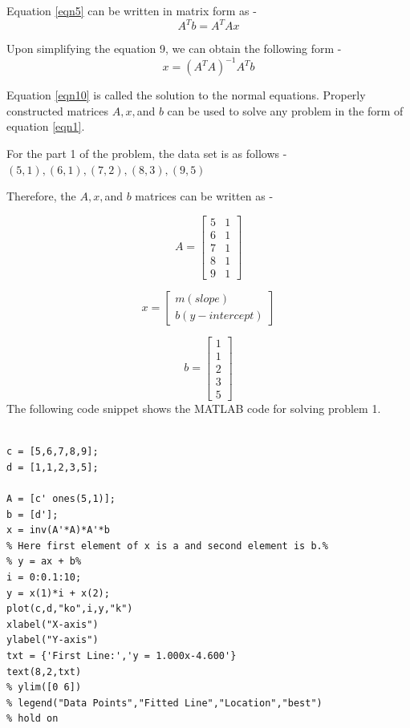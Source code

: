 \documentclass{article}
\begin{document}
Equation \ref{eqn5} can be written in matrix form as - 
\begin{equation}\label{eqn9}
A^Tb = A^TAx
\end{equation}

Upon simplifying the equation 9, we can obtain the following form - 
\begin{equation}\label{eqn10}
x = (A^TA)^{-1}A^Tb
\end{equation}

Equation \ref{eqn10} is called the solution to the normal equations. Properly constructed matrices $A,x, $and $b$ can be used to solve any problem in the form of equation \ref{eqn1}.

For the part 1 of the problem, the data set is as follows - $(5,1),(6,1),(7,2),(8,3),(9,5)$

Therefore, the $A,x, $and $b$ matrices can be written as - 

\begin{equation}\label{eqn11}
A = 
\begin{bmatrix}
 5&1\\6&1\\7&1\\8&1\\9&1
\end{bmatrix}
\end{equation}

\begin{equation}\label{eqn12}
x = 
\begin{bmatrix}
m (slope) \\ b (y-intercept)
\end{bmatrix}
\end{equation}

\begin{equation}\label{eqn13}
b = 
\begin{bmatrix}
1\\1\\2\\3\\5
\end{bmatrix}
\end{equation}
 The following code snippet shows the MATLAB code for solving problem 1.\\
\begin{lstlisting}[frame=single]
% Part 1 %

c = [5,6,7,8,9];
d = [1,1,2,3,5];

A = [c' ones(5,1)];
b = [d'];
x = inv(A'*A)*A'*b
% Here first element of x is a and second element is b.%
% y = ax + b%
i = 0:0.1:10;
y = x(1)*i + x(2);
plot(c,d,"ko",i,y,"k")
xlabel("X-axis")
ylabel("Y-axis")
txt = {'First Line:','y = 1.000x-4.600'}
text(8,2,txt)
% ylim([0 6])
% legend("Data Points","Fitted Line","Location","best")
% hold on

\end{lstlisting}
\end{document}
